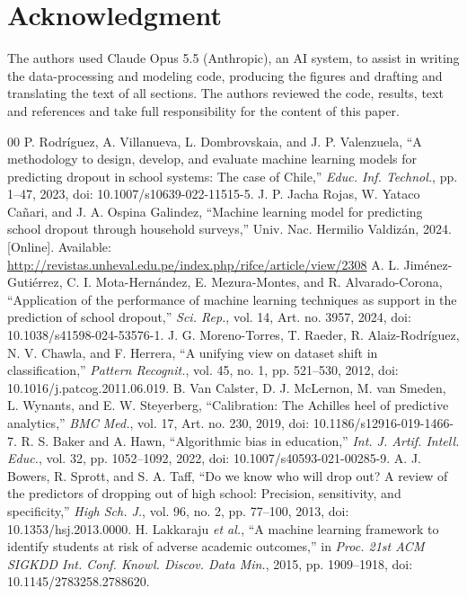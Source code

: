 \documentclass[conference]{IEEEtran}
\begin{document}
\section*{Acknowledgment}
The authors used Claude Opus 5.5 (Anthropic), an AI system, to assist in writing the data-processing and modeling code, producing the figures and drafting and translating the text of all sections. The authors reviewed the code, results, text and references and take full responsibility for the content of this paper.

\begin{thebibliography}{00}
 P. Rodr\'iguez, A. Villanueva, L. Dombrovskaia, and J. P. Valenzuela, ``A methodology to design, develop, and evaluate machine learning models for predicting dropout in school systems: The case of Chile,'' \textit{Educ. Inf. Technol.}, pp. 1--47, 2023, doi: 10.1007/s10639-022-11515-5.
 J. P. Jacha Rojas, W. Yataco Ca\~nari, and J. A. Ospina Galindez, ``Machine learning model for predicting school dropout through household surveys,'' Univ. Nac. Hermilio Valdiz\'an, 2024. [Online]. Available: \url{http://revistas.unheval.edu.pe/index.php/rifce/article/view/2308}
 A. L. Jim\'enez-Guti\'errez, C. I. Mota-Hern\'andez, E. Mezura-Montes, and R. Alvarado-Corona, ``Application of the performance of machine learning techniques as support in the prediction of school dropout,'' \textit{Sci. Rep.}, vol. 14, Art. no. 3957, 2024, doi: 10.1038/s41598-024-53576-1.
 J. G. Moreno-Torres, T. Raeder, R. Alaiz-Rodr\'iguez, N. V. Chawla, and F. Herrera, ``A unifying view on dataset shift in classification,'' \textit{Pattern Recognit.}, vol. 45, no. 1, pp. 521--530, 2012, doi: 10.1016/j.patcog.2011.06.019.
 B. Van Calster, D. J. McLernon, M. van Smeden, L. Wynants, and E. W. Steyerberg, ``Calibration: The Achilles heel of predictive analytics,'' \textit{BMC Med.}, vol. 17, Art. no. 230, 2019, doi: 10.1186/s12916-019-1466-7.
 R. S. Baker and A. Hawn, ``Algorithmic bias in education,'' \textit{Int. J. Artif. Intell. Educ.}, vol. 32, pp. 1052--1092, 2022, doi: 10.1007/s40593-021-00285-9.
 A. J. Bowers, R. Sprott, and S. A. Taff, ``Do we know who will drop out? A review of the predictors of dropping out of high school: Precision, sensitivity, and specificity,'' \textit{High Sch. J.}, vol. 96, no. 2, pp. 77--100, 2013, doi: 10.1353/hsj.2013.0000.
 H. Lakkaraju \textit{et al.}, ``A machine learning framework to identify students at risk of adverse academic outcomes,'' in \textit{Proc. 21st ACM SIGKDD Int. Conf. Knowl. Discov. Data Min.}, 2015, pp. 1909--1918, doi: 10.1145/2783258.2788620.

\end{thebibliography}
\end{document}
